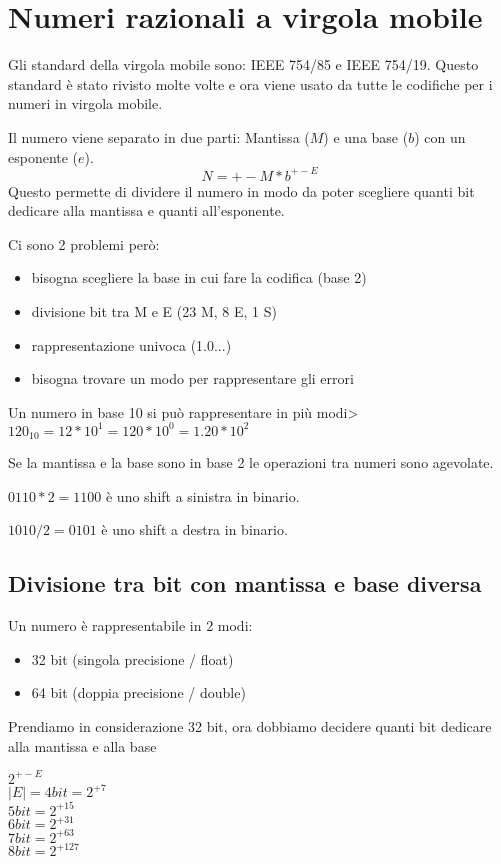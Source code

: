 \documentclass[a4paper]{article}
\theoremstyle{break}
\theoremstyle{break}
\theoremstyle{break}
\theoremstyle{break}
\theoremstyle{break}
\begin{document}
\section{Numeri razionali a virgola mobile}
Gli standard della virgola mobile sono: IEEE 754/85 e IEEE 754/19. Questo standard
è stato rivisto molte volte e ora viene usato da tutte le codifiche per i numeri in
virgola mobile.

Il numero viene separato in due parti: Mantissa (\( M \)) e una base (\(b\))
con un esponente ($e$).
\[
	N = +- M * b^{+-E}
\]
Questo permette di dividere il numero in modo da poter scegliere quanti bit dedicare
alla mantissa e quanti all'esponente.

Ci sono 2 problemi però:
\begin{itemize}
	\item bisogna scegliere la base in cui fare la codifica (base 2)
	\item divisione bit tra M e E (23 M, 8 E, 1 S)
	\item rappresentazione univoca (1.0...)
	\item bisogna trovare un modo per rappresentare gli errori
\end{itemize}

Un numero in base 10 si può rappresentare in più modi>
\(120_{10} = 12*10^{1} = 120 * 10^{0} = 1.20 * 10^{2}\)

Se la mantissa e la base sono in base 2 le operazioni tra numeri sono agevolate.

\(0110 * 2 = 1100\) è uno shift a sinistra in binario.

\(1010/2 = 0101\) è uno shift a destra in binario.

\subsection{Divisione tra bit con mantissa e base diversa}
Un numero è rappresentabile in 2 modi:
\begin{itemize}
	\item 32 bit (singola precisione / float)
	\item 64 bit (doppia precisione / double)
\end{itemize}

Prendiamo in considerazione 32 bit, ora dobbiamo decidere quanti bit dedicare alla
mantissa e alla base

$2^{+-E}$\\
$|E| = 4 bit = 2^{+7}$\\
$5 bit = 2^{+15}$\\
$6 bit = 2^{+31}$\\
$7 bit = 2^{+63}$\\
$8 bit = 2^{+127}$
\end{document}
